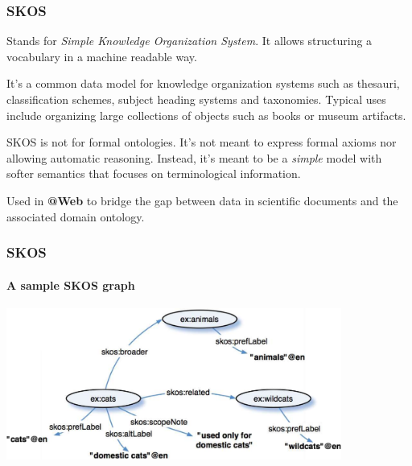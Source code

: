 \documentclass{beamer}
\makeatletter
\newcommand{\atweb}{\textbf{@Web}\xspace}
\makeatother
\begin{document}
\begin{frame}
  \frametitle{SKOS}

  Stands for \textit{Simple Knowledge Organization System}. It allows
  structuring a vocabulary in a machine readable way.

  \pause

  \medskip

  It's a common data model for knowledge organization systems such as thesauri,
  classification schemes, subject heading systems and taxonomies. Typical uses
  include organizing large collections of objects such as books or museum
  artifacts.

  \pause

  \medskip

  SKOS is not for formal ontologies. It's not meant to express formal axioms
  nor allowing automatic reasoning. Instead, it's meant to be a \textit{simple}
  model with softer semantics that focuses on terminological information.

  \pause

  \medskip

  Used in \atweb to bridge the gap between data in scientific documents and the
  associated domain ontology.
\end{frame}

\begin{frame}
  \frametitle{SKOS}
  \framesubtitle{A sample SKOS graph}

  \begin{center}
    \includegraphics[width=11cm]{skos.png}
  \end{center}
\end{frame}
\end{document}
